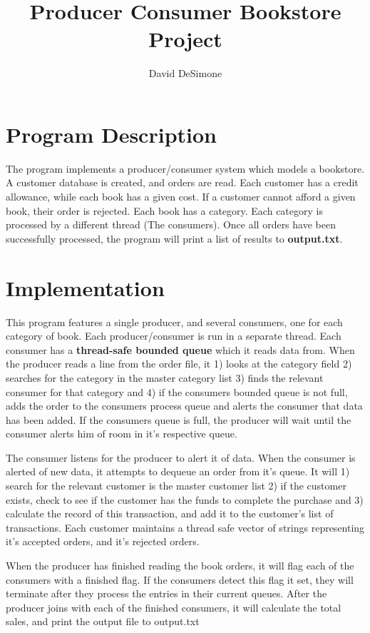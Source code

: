 \documentclass[]{article}
\title{Producer Consumer Bookstore Project}
\author{David DeSimone}
\begin{document}
\maketitle

\section{Program Description}
\par 
The program implements a producer/consumer system which models a bookstore. A customer database is created, and
orders are read. Each customer has a credit allowance, while each book has a given cost. If a customer cannot afford a given book, their order is rejected. Each book has a category. Each category is processed by a different thread (The consumers). Once all orders have been successfully processed, the program will print a list of results to \textbf{output.txt}.

\section{Implementation}
\par 
This program features a single producer, and several consumers, one for each category of book. Each producer/consumer is run in a separate thread. Each consumer has a \textbf{thread-safe bounded queue} which it reads data from. When the producer reads a line from the order file, it 1) looks at the category field 2) searches for the category in the master category list 3) finds the relevant consumer for that category and 4) if the consumers bounded queue is not full, adds the order to the consumers process queue and alerts the consumer that data has been added. If the consumers queue is full, the producer will wait until the consumer alerts him of room in it's respective queue. \par 

The consumer listens for the producer to alert it of data. When the consumer is alerted of new data, it attempts to dequeue an order from it's queue. It will 1) search for the relevant customer is the master customer list 2) if the customer exists, check to see if the customer has the funds to complete the purchase  and 3) calculate the record of this transaction, and add it to the customer's list of transactions. Each customer maintains a thread safe vector of strings representing it's accepted orders, and it's rejected orders. \par 

When the producer has finished reading the book orders, it will flag each of the consumers with a finished flag.
If the consumers detect this flag it set, they will terminate after they process the entries in their current
queues. After the producer joins with each of the finished consumers, it will calculate the total sales, and print the output file to output.txt   
\end{document}
